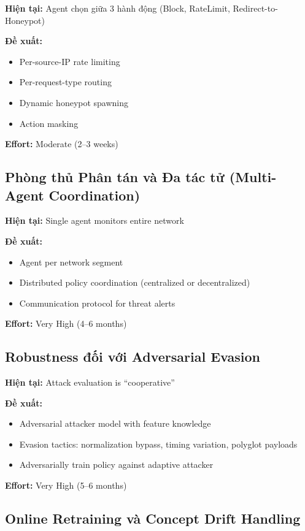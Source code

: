 \documentclass[12pt,a4paper,twoside]{report}
\begin{document}
\textbf{Hiện tại:} Agent chọn giữa 3 hành động (Block, RateLimit, Redirect-to-Honeypot)

\textbf{Đề xuất:}
\begin{itemize}
\item Per-source-IP rate limiting
\item Per-request-type routing
\item Dynamic honeypot spawning
\item Action masking
\end{itemize}

\textbf{Effort:} Moderate (2--3 weeks)

\subsection{Phòng thủ Phân tán và Đa tác tử (Multi-Agent Coordination)}

\textbf{Hiện tại:} Single agent monitors entire network

\textbf{Đề xuất:}
\begin{itemize}
\item Agent per network segment
\item Distributed policy coordination (centralized or decentralized)
\item Communication protocol for threat alerts
\end{itemize}

\textbf{Effort:} Very High (4--6 months)

\subsection{Robustness đối với Adversarial Evasion}

\textbf{Hiện tại:} Attack evaluation is ``cooperative''

\textbf{Đề xuất:}
\begin{itemize}
\item Adversarial attacker model with feature knowledge
\item Evasion tactics: normalization bypass, timing variation, polyglot payloads
\item Adversarially train policy against adaptive attacker
\end{itemize}

\textbf{Effort:} Very High (5--6 months)

\subsection{Online Retraining và Concept Drift Handling}
\end{document}

